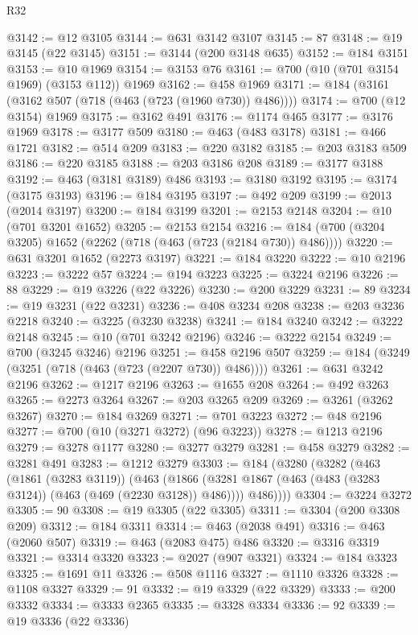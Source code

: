 \begin{lexlean}{R32}
\begin{coremodule}
@3142 := @12 @3105
@3144 := @631 @3142 @3107
@3145 := 87
@3148 := @19 @3145 (@22 @3145)
@3151 := @3144 (@200 @3148 @635)
@3152 := @184 @3151
@3153 := @10 @1969
@3154 := @3153 @76
@3161 := @700 (@10 (@701 @3154 @1969) (@3153 @112)) @1969
@3162 := @458 @1969
@3171 := @184 (@3161 (@3162 @507 (@718 (@463 (@723 (@1960 @730)) @486))))
@3174 := @700 (@12 @3154) @1969
@3175 := @3162 @491
@3176 := @1174 @465
@3177 := @3176 @1969
@3178 := @3177 @509
@3180 := @463 (@483 @3178)
@3181 := @466 @1721
@3182 := @514 @209
@3183 := @220 @3182
@3185 := @203 @3183 @509
@3186 := @220 @3185
@3188 := @203 @3186 @208
@3189 := @3177 @3188
@3192 := @463 (@3181 @3189) @486
@3193 := @3180 @3192
@3195 := @3174 (@3175 @3193)
@3196 := @184 @3195
@3197 := @492 @209
@3199 := @2013 (@2014 @3197)
@3200 := @184 @3199
@3201 := @2153 @2148
@3204 := @10 (@701 @3201 @1652)
@3205 := @2153 @2154
@3216 := @184 (@700 (@3204 @3205) @1652 (@2262 (@718 (@463 (@723 (@2184 @730)) @486))))
@3220 := @631 @3201 @1652 (@2273 @3197)
@3221 := @184 @3220
@3222 := @10 @2196
@3223 := @3222 @57
@3224 := @194 @3223
@3225 := @3224 @2196
@3226 := 88
@3229 := @19 @3226 (@22 @3226)
@3230 := @200 @3229
@3231 := 89
@3234 := @19 @3231 (@22 @3231)
@3236 := @408 @3234 @208
@3238 := @203 @3236 @2218
@3240 := @3225 (@3230 @3238)
@3241 := @184 @3240
@3242 := @3222 @2148
@3245 := @10 (@701 @3242 @2196)
@3246 := @3222 @2154
@3249 := @700 (@3245 @3246) @2196
@3251 := @458 @2196 @507
@3259 := @184 (@3249 (@3251 (@718 (@463 (@723 (@2207 @730)) @486))))
@3261 := @631 @3242 @2196
@3262 := @1217 @2196
@3263 := @1655 @208
@3264 := @492 @3263
@3265 := @2273 @3264
@3267 := @203 @3265 @209
@3269 := @3261 (@3262 @3267)
@3270 := @184 @3269
@3271 := @701 @3223
@3272 := @48 @2196
@3277 := @700 (@10 (@3271 @3272) (@96 @3223))
@3278 := @1213 @2196
@3279 := @3278 @1177
@3280 := @3277 @3279
@3281 := @458 @3279
@3282 := @3281 @491
@3283 := @1212 @3279
@3303 := @184
    (@3280
      (@3282
        (@463
          (@1861 (@3283 @3119))
          (@463
            (@1866 (@3281 @1867 (@463 (@483 (@3283 @3124)) (@463 (@469 (@2230 @3128)) @486))))
            @486))))
@3304 := @3224 @3272
@3305 := 90
@3308 := @19 @3305 (@22 @3305)
@3311 := @3304 (@200 @3308 @209)
@3312 := @184 @3311
@3314 := @463 (@2038 @491)
@3316 := @463 (@2060 @507)
@3319 := @463 (@2083 @475) @486
@3320 := @3316 @3319
@3321 := @3314 @3320
@3323 := @2027 (@907 @3321)
@3324 := @184 @3323
@3325 := @1691 @11
@3326 := @508 @1116
@3327 := @1110 @3326
@3328 := @1108 @3327
@3329 := 91
@3332 := @19 @3329 (@22 @3329)
@3333 := @200 @3332
@3334 := @3333 @2365
@3335 := @3328 @3334
@3336 := 92
@3339 := @19 @3336 (@22 @3336)

\end{coremodule}
\end{lexlean}
